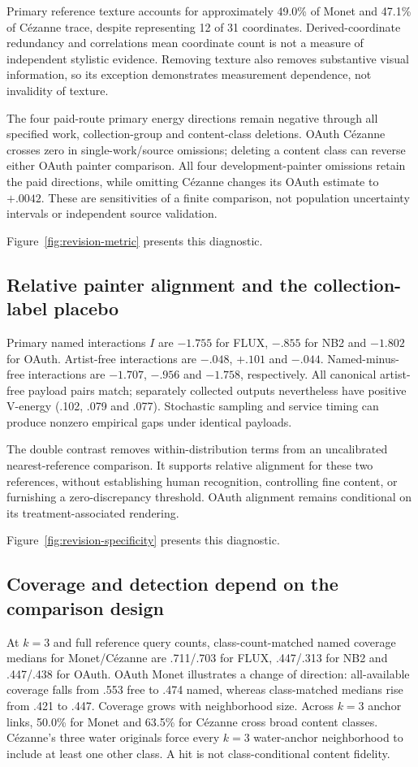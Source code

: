 Primary reference texture accounts for approximately 49.0\% of Monet and 47.1\%
of C\'ezanne trace, despite representing 12 of 31 coordinates. Derived-coordinate
redundancy and correlations mean coordinate count is not a measure of independent
stylistic evidence. Removing texture also removes substantive visual information,
so its exception demonstrates measurement dependence, not invalidity of texture.

The four paid-route primary energy directions remain negative through all
specified work, collection-group and content-class deletions. OAuth C\'ezanne
crosses zero in single-work/source omissions; deleting a content class can reverse
either OAuth painter comparison. All four development-painter omissions retain
the paid directions, while omitting C\'ezanne changes its OAuth estimate to
$+.0042$. These are sensitivities of a finite comparison, not population
uncertainty intervals or independent source validation.

Figure~\ref{fig:revision-metric} presents this diagnostic.

\subsection{Relative painter alignment and the collection-label placebo}
Primary named interactions $I$ are $-1.755$ for FLUX, $-.855$ for NB2 and
$-1.802$ for OAuth. Artist-free interactions are $-.048$, $+.101$ and $-.044$.
Named-minus-free interactions are $-1.707$, $-.956$ and $-1.758$, respectively.
All canonical artist-free payload pairs match; separately collected outputs
nevertheless have positive V-energy (.102, .079 and .077). Stochastic sampling
and service timing can produce nonzero empirical gaps under identical payloads.

The double contrast removes within-distribution terms from an uncalibrated
nearest-reference comparison. It supports relative alignment for these two
references, without establishing human recognition, controlling fine content,
or furnishing a zero-discrepancy threshold. OAuth alignment remains conditional
on its treatment-associated rendering.

Figure~\ref{fig:revision-specificity} presents this diagnostic.

\subsection{Coverage and detection depend on the comparison design}
At $k=3$ and full reference query counts, class-count-matched named coverage
medians for Monet/C\'ezanne are .711/.703 for FLUX, .447/.313 for NB2 and
.447/.438 for OAuth. OAuth Monet illustrates a change of direction: all-available
coverage falls from .553 free to .474 named, whereas class-matched medians rise
from .421 to .447. Coverage grows with neighborhood size. Across $k=3$ anchor
links, 50.0\% for Monet and 63.5\% for C\'ezanne cross broad content classes.
C\'ezanne's three water originals force every $k=3$ water-anchor neighborhood to
include at least one other class. A hit is not class-conditional content fidelity.

